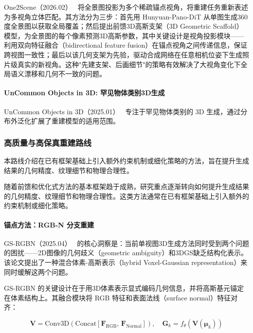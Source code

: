 One2Scene（2026.02）~\cite{2602_19766} 将全景图投影为多个稀疏锚点视角，将重建任务重新表述为多视角立体匹配。其方法分为三步：首先用 Hunyuan-Pano-DiT 从单图生成360度全景图以获取全局覆盖；然后提出前馈3D高斯支架（3D Geometric Scaffold）模型，为全景图的每个像素预测3D高斯参数，其中关键设计是视角投影模块——利用双向特征融合（bidirectional feature fusion）在锚点视角之间传递信息，保证跨视图一致性；最后以该几何支架为先验，驱动合成网络在任意相机位姿下生成照片级真实的新视角。这种"先建支架、后画细节"的策略有效解决了大视角变化下全局语义漂移和几何不一致的问题。

\paragraph{UnCommon Objects in 3D: 罕见物体类别3D生成}

UnCommon Objects in 3D（2025.01）~\cite{2501_07574} 专注于罕见物体类别的 3D 生成，通过分布外泛化扩展了重建模型的适用范围。

\subsubsection{高质量与高保真重建路线}
\label{sec:08_2_1_4}

本路线介绍在已有框架基础上引入额外约束机制或细化策略的方法，旨在提升生成结果的几何精度、纹理细节和物理合理性。

随着前馈和优化式方法的基本框架趋于成熟，研究重点逐渐转向如何提升生成结果的几何精度、纹理细节和物理合理性。这类方法通常在已有框架基础上引入额外的约束机制或细化策略。

\paragraph{锚点方法：RGB-N 分支重建}

GS-RGBN（2025.04）~\cite{2504_01512} 的核心洞察是：当前单视图3D生成方法同时受到两个问题的困扰——2D图像的几何歧义（geometric ambiguity）和3DGS缺乏结构化表示。该论文提出了一种混合体素-高斯表示（hybrid Voxel-Gaussian representation）来同时缓解这两个问题。

GS-RGBN 的关键设计在于用3D体素表示显式编码几何信息，并将高斯基元锚定在体素结构上。其融合模块将 RGB 特征和表面法线（surface normal）特征对齐：

\begin{equation}
\label{eq:gsrgbn_fusion}
\mathbf{V} = \mathrm{Conv3D}\!\left(\mathrm{Concat}\!\left[\mathbf{F}_{\mathrm{RGB}}, \, \mathbf{F}_{\mathrm{Normal}}\right]\right), \quad \mathbf{G}_k = f_{\theta}\!\left(\mathbf{V}(\boldsymbol{\mu}_k)\right)
\end{equation}

